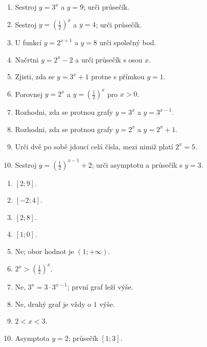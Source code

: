 \documentclass[11pt,a4paper]{article}
\begin{document}
\begin{zadaniReseniBox}[title={Samostatná práce 1}]
\begin{enumerate}[label=\alph*)]
  \item Sestroj $y=3^x$ a $y=9$; urči průsečík.
  \item Sestroj $y=\left(\frac{1}{2}\right)^x$ a $y=4$; urči průsečík.
  \item U funkcí $y=2^{x+1}$ a $y=8$ urči společný bod.
  \item Načrtni $y=2^x-2$ a urči průsečík s osou $x$.
  \item Zjisti, zda se $y=3^x+1$ protne s přímkou $y=1$.
  \item Porovnej $y=2^x$ a $y=\left(\frac{1}{2}\right)^x$ pro $x>0$.
  \item Rozhodni, zda se protnou grafy $y=3^x$ a $y=3^{x-1}$.
  \item Rozhodni, zda se protnou grafy $y=2^x$ a $y=2^x+1$.
  \item Urči dvě po sobě jdoucí celá čísla, mezi nimiž platí $2^x=5$.
  \item Sestroj $y=\left(\frac{1}{2}\right)^{x-1}+2$; urči asymptotu a průsečík s $y=3$.
\end{enumerate}
\tcblower
\begin{enumerate}[label=\alph*)]
  \item $[2;9]$.
  \item $[-2;4]$.
  \item $[2;8]$.
  \item $[1;0]$.
  \item Ne; obor hodnot je $(1;+\infty)$.
  \item $2^x>\left(\frac{1}{2}\right)^x$.
  \item Ne, $3^x=3\cdot3^{x-1}$; první graf leží výše.
  \item Ne, druhý graf je vždy o $1$ výše.
  \item $2<x<3$.
  \item Asymptota $y=2$; průsečík $[1;3]$.
\end{enumerate}
\end{zadaniReseniBox}

\end{document}
